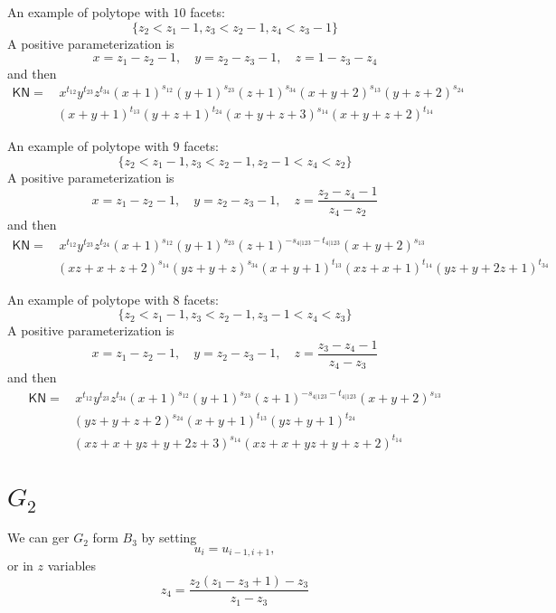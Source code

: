 \documentclass[12pt]{article}
\theoremstyle{definition}
\theoremstyle{plain}
\begin{document}
\vspace{2em}

An example of polytope with $10$ facets:
\[
    \{z_2<z_1-1, z_3<z_2-1, z_4<z_3-1\}
\]
A positive parameterization is 
\[
    x=z_1-z_2-1,\quad y=z_2-z_3-1,\quad z=1-z_3-z_4
\]
and then 
\[
\begin{aligned}
    \mathsf{KN} =&\, x^{t_{12}} y^{t_{23}} z^{t_{34}} (x+1)^{s_{12}} (y+1)^{s_{23}} (z+1)^{s_{34}}  (x+y+2)^{s_{13}} (y+z+2)^{s_{24}} \\ 
    &(x+y+1)^{t_{13}} (y+z+1)^{t_{24}} (x+y+z+3)^{s_{14}} (x+y+z+2)^{t_{14}}
\end{aligned}
\]

\vspace{2em}

An example of polytope with $9$ facets:
\[
    \{z_2<z_1-1, z_3<z_2-1, z_2-1<z_4<z_2\}
\]
A positive parameterization is 
\[
    x=z_1-z_2-1,\quad y=z_2-z_3-1,\quad z=\frac{z_2-z_4-1}{z_4-z_2}
\]
and then 
\[
\begin{aligned}
    \mathsf{KN} =&\, x^{t_{12}} y^{t_{23}} z^{t_{24}} (x+1)^{s_{12}} (y+1)^{s_{23}} (z+1)^{-s_{4|123}-t_{4|123}} (x+y+2)^{s_{13}} \\ 
    &(x z+x+z+2)^{s_{14}} (y z+y+z)^{s_{34}} (x+y+1)^{t_{13}} (x z+x+1)^{t_{14}} (y z+y+2 z+1)^{t_{34}}
\end{aligned}
\]

\vspace{2em}

An example of polytope with $8$ facets:
\[
    \{z_2<z_1-1, z_3<z_2-1, z_3-1<z_4<z_3\}
\]
A positive parameterization is 
\[
    x=z_1-z_2-1,\quad y=z_2-z_3-1,\quad z=\frac{z_3-z_4-1}{z_4-z_3}
\]
and then 
\[
\begin{aligned}
    \mathsf{KN} =&\, x^{t_{12}} y^{t_{23}} z^{t_{34}} (x+1)^{s_{12}} (y+1)^{s_{23}} (z+1)^{-s_{4|123}-t_{4|123}} (x+y+2)^{s_{13}} \\
    &(y z+y+z+2)^{s_{24}} (x+y+1)^{t_{13}} (y z+y+1)^{t_{24}} \\ 
    &(x z+x+y z+y+2 z+3)^{s_{14}} (x z+x+y z+y+z+2)^{t_{14}}
\end{aligned}
\]

\section{$G_2$}

We can ger $G_2$ form $B_3$ by setting 
\[
    u_i=u_{i-1,i+1},
\]
or in $z$ variables
\[
    z_4=\frac{z_2 \left(z_1-z_3+1\right)-z_3}{z_1-z_3}
\]
\end{document}
